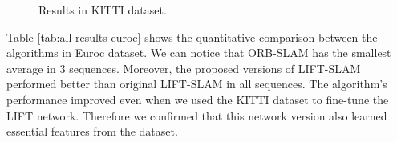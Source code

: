 \begin{figure}
\centering
{}
\qquad
{}

\qquad
{}

\qquad
{}

\qquad
{}

\caption{Results in KITTI dataset.}
\label{fig:all-traj-kitti}
\end{figure}

Table \ref{tab:all-results-euroc} shows the quantitative comparison between the algorithms in Euroc dataset. We can notice that ORB-SLAM has the smallest average in 3 sequences. Moreover, the proposed versions of LIFT-SLAM performed better than original LIFT-SLAM in all sequences. The algorithm's performance improved even when we used the KITTI dataset to fine-tune the LIFT network. Therefore we confirmed that this network version also learned essential features from the dataset.


